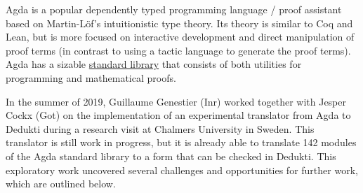 


Agda is a popular dependently typed programming language / proof
assistant based on Martin-L\"of’s intuitionistic type theory. Its theory
is similar to Coq and Lean, but is more focused on interactive
development and direct manipulation of proof terms (in contrast to
using a tactic language to generate the proof terms). Agda has a
sizable \href{https://github.com/agda/agda-stdlib}{standard library}
that consists of both utilities for programming and mathematical proofs.

In the summer of 2019, Guillaume Genestier (Inr) worked together with Jesper
Cockx (Got) on the implementation of an experimental translator from Agda to
Dedukti during a research visit at Chalmers University in Sweden. This
translator is still work in progress, but it is already able to
translate 142 modules of the Agda standard library to a form that can
be checked in Dedukti. This exploratory work uncovered several
challenges and opportunities for further work, which are outlined
below.

